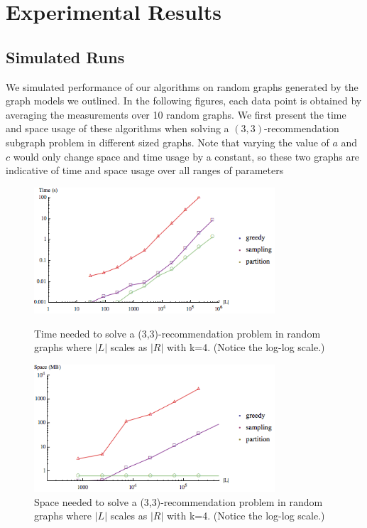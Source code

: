\section{Experimental Results}

\subsection{Simulated Runs}
We simulated performance of our algorithms on random graphs generated
by the graph models we outlined. 
In the following figures, each data
point is obtained by averaging the measurements over 10 random
graphs. We first present the time and space usage of these algorithms when
solving a $(3,3)$-recommendation subgraph problem in different sized graphs.
Note that varying the value of $a$ and $c$ would only change space and time
usage by a constant, so these two graphs are indicative of time and space
usage over all ranges of parameters

\begin{figure}[t]
\centering
\begin{minipage}[h]{0.48\textwidth}
\centering
\includegraphics[width=0.8\textwidth]{images/time.png}
\caption{Time needed to solve a (3,3)-recommendation problem in random graphs where $|L|$ scales as $|R|$ with k=4. (Notice the log-log scale.)}\label{fig:time_graph}
\end{minipage}
\hspace{0cm}
\begin{minipage}[h]{0.48\textwidth}
\centering
\includegraphics[width=0.8\textwidth]{images/space.png}
\caption{Space needed to solve a (3,3)-recommendation problem in random graphs where $|L|$ scales as $|R|$ with k=4. (Notice the log-log scale.)}\label{fig:space_graph}
\end{minipage}
\vspace{-0.2in}
\end{figure}
\vs

